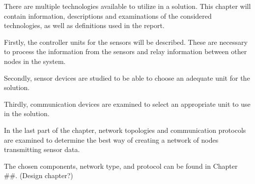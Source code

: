 \label{cha:technologies}
There are multiple technologies available to utilize in a solution. This chapter will contain information, descriptions and examinations of the considered technologies, as well as definitions used in the report.

Firstly, the controller units for the sensors will be described. These are necessary to process the information from the sensors and relay information between other nodes in the system.

Secondly, sensor devices are studied to be able to choose an adequate unit for the solution.

Thirdly, communication devices are examined to select an appropriate unit to use in the solution. 

In the last part of the chapter, network topologies and communication protocols are examined to determine the best way of creating a network of nodes transmitting sensor data.

The chosen components, network type, and protocol can be found in Chapter \#\#. (Design chapter?)








